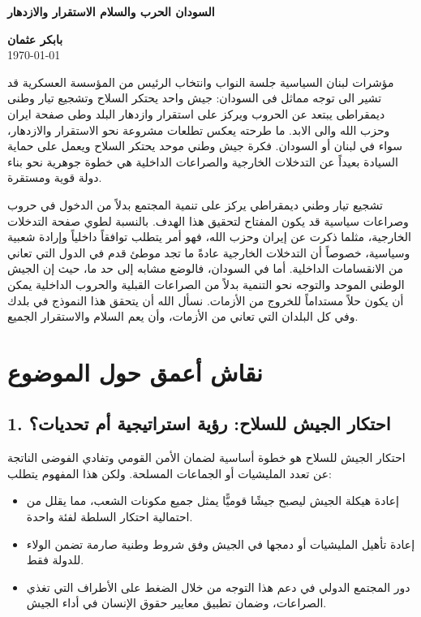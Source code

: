 \documentclass[12pt]{article}
\begin{document}
\begin{center}
    {\Huge\textbf{\textcolor{titleColor}{ السودان  الحرب والسلام الاستقرار والازدهار }}}
    \vspace{0.5cm}

    \textbf{\textcolor{emphasisColor}{بابكر عثمان}} \\
    \vspace{0.2cm}
    \today
\end{center}

مؤشرات لبنان السياسية جلسة النواب وانتخاب الرئيس من المؤسسة العسكرية قد تشير الى توجه مماثل فى السودان: جيش واحد يحتكر السلاح وتشجيع تيار وطنى ديمقراطى يبتعد عن الحروب ويركز على استقرار وازدهار البلد وطى صفحة ايران وحزب الله والى الابد. ما طرحته يعكس تطلعات مشروعة نحو الاستقرار والازدهار، سواء في لبنان أو السودان. فكرة جيش وطني موحد يحتكر السلاح ويعمل على حماية السيادة بعيداً عن التدخلات الخارجية والصراعات الداخلية هي خطوة جوهرية نحو بناء دولة قوية ومستقرة.

تشجيع تيار وطني ديمقراطي يركز على تنمية المجتمع بدلاً من الدخول في حروب وصراعات سياسية قد يكون المفتاح لتحقيق هذا الهدف. بالنسبة لطوي صفحة التدخلات الخارجية، مثلما ذكرت عن إيران وحزب الله، فهو أمر يتطلب توافقاً داخلياً وإرادة شعبية وسياسية، خصوصاً أن التدخلات الخارجية عادةً ما تجد موطئ قدم في الدول التي تعاني من الانقسامات الداخلية. أما في السودان، فالوضع مشابه إلى حد ما، حيث إن الجيش الوطني الموحد والتوجه نحو التنمية بدلاً من الصراعات القبلية والحروب الداخلية يمكن أن يكون حلاً مستداماً للخروج من الأزمات. نسأل الله أن يتحقق هذا النموذج في بلدك وفي كل البلدان التي تعاني من الأزمات، وأن يعم السلام والاستقرار الجميع.

\section*{نقاش أعمق حول الموضوع}

\subsection*{1. احتكار الجيش للسلاح: رؤية استراتيجية أم تحديات؟}
احتكار الجيش للسلاح هو خطوة أساسية لضمان الأمن القومي وتفادي الفوضى الناتجة عن تعدد المليشيات أو الجماعات المسلحة. ولكن هذا المفهوم يتطلب:
\begin{itemize}
    \item إعادة هيكلة الجيش ليصبح جيشًا قوميًّا يمثل جميع مكونات الشعب، مما يقلل من احتمالية احتكار السلطة لفئة واحدة.
    \item إعادة تأهيل المليشيات أو دمجها في الجيش وفق شروط وطنية صارمة تضمن الولاء للدولة فقط.
    \item دور المجتمع الدولي في دعم هذا التوجه من خلال الضغط على الأطراف التي تغذي الصراعات، وضمان تطبيق معايير حقوق الإنسان في أداء الجيش.
\end{itemize}
\end{document}
